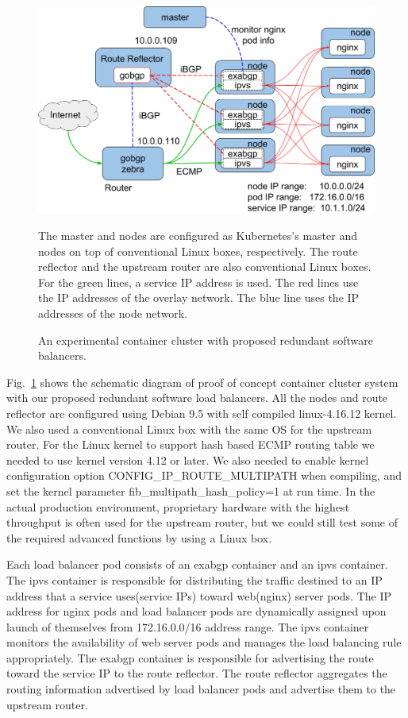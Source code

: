 \begin{figure}[tb]
\begin{center}
\includegraphics[width=\columnwidth]{Figs/poc.png}
\end{center}
\caption{An experimental container cluster with proposed redundant software balancers. }
  The master and nodes are configured as Kubernetes's master and nodes on top of conventional Linux boxes, respectively.
  The route reflector and the upstream router are also conventional Linux boxes.
  For the green lines, a service IP address is used. The red lines use the IP addresses of the overlay network. The blue line uses the IP addresses of the node network.
\label{fig:poc}
\end{figure}

Fig.~\ref{fig:poc} shows the schematic diagram of proof of concept container cluster system with our proposed redundant software load balancers.
All the nodes and route reflector are configured using Debian 9.5 with self compiled linux-4.16.12 kernel.  
We also used a conventional Linux box with the same OS for the upstream router.
For the Linux kernel to support hash based ECMP routing table we needed to use kernel version 4.12 or later.
We also needed to enable kernel configuration option CONFIG\_IP\_ROUTE\_MULTIPATH\cite{ip-sysctl} when compiling, and set the kernel parameter fib\_multipath\_hash\_policy=1 at run time.
In the actual production environment, proprietary hardware with the highest throughput is often used for the upstream router, but we could still test some of the required advanced functions by using a Linux box.

Each load balancer pod consists of an exabgp container and an ipvs container.
The ipvs container is responsible for distributing the traffic destined to an IP address that a service uses(service IPs) toward web(nginx) server pods.
The IP address for nginx pods and load balancer pods are dynamically assigned upon launch of themselves from 172.16.0.0/16 address range.
The ipvs container monitors the availability of web server pods and manages the load balancing rule appropriately.
The exabgp container is responsible for advertising the route toward the service IP to the route reflector.
The route reflector aggregates the routing information advertised by load balancer pods and advertise them to the upstream router.

